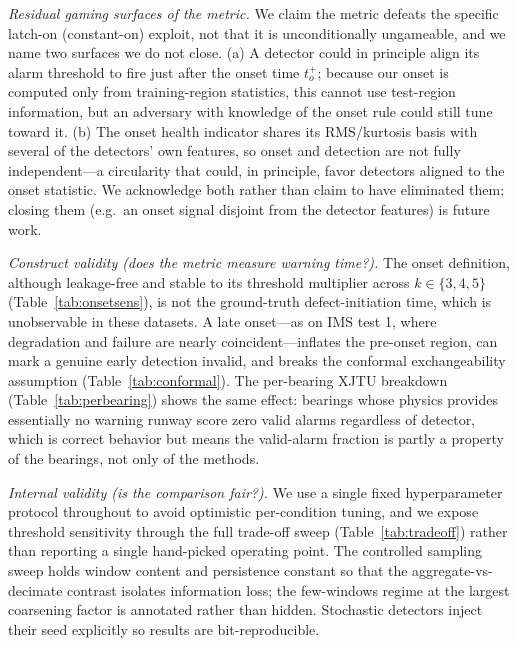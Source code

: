 \documentclass[IJPHM, 2026, 0]{PHMSociety}
\begin{document}
\emph{Residual gaming surfaces of the metric.} We claim the metric defeats the specific latch-on (constant-on) exploit, not that it is unconditionally ungameable, and we name two surfaces we do not close. (a) A detector could in principle align its alarm threshold to fire just after the onset time $t_o^+$; because our onset is computed only from training-region statistics, this cannot use test-region information, but an adversary with knowledge of the onset rule could still tune toward it. (b) The onset health indicator shares its RMS/kurtosis basis with several of the detectors' own features, so onset and detection are not fully independent---a circularity that could, in principle, favor detectors aligned to the onset statistic. We acknowledge both rather than claim to have eliminated them; closing them (e.g.\ an onset signal disjoint from the detector features) is future work.

\emph{Construct validity (does the metric measure warning time?).} The onset definition, although leakage-free and stable to its threshold multiplier across $k \in \{3,4,5\}$ (Table~\ref{tab:onsetsens}), is not the ground-truth defect-initiation time, which is unobservable in these datasets. A late onset---as on IMS test 1, where degradation and failure are nearly coincident---inflates the pre-onset region, can mark a genuine early detection invalid, and breaks the conformal exchangeability assumption (Table~\ref{tab:conformal}). The per-bearing XJTU breakdown (Table~\ref{tab:perbearing}) shows the same effect: bearings whose physics provides essentially no warning runway score zero valid alarms regardless of detector, which is correct behavior but means the valid-alarm fraction is partly a property of the bearings, not only of the methods.

\emph{Internal validity (is the comparison fair?).} We use a single fixed hyperparameter protocol throughout to avoid optimistic per-condition tuning, and we expose threshold sensitivity through the full trade-off sweep (Table~\ref{tab:tradeoff}) rather than reporting a single hand-picked operating point. The controlled sampling sweep holds window content and persistence constant so that the aggregate-vs-decimate contrast isolates information loss; the few-windows regime at the largest coarsening factor is annotated rather than hidden. Stochastic detectors inject their seed explicitly so results are bit-reproducible.
\end{document}
